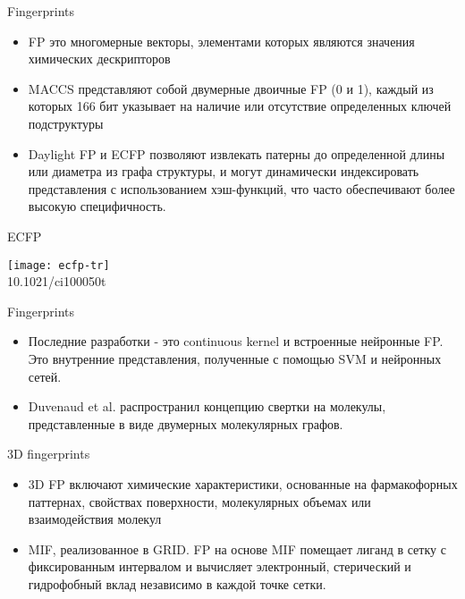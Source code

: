 \begin{frame}{Fingerprints}
    \begin{itemize}
        \item FP это многомерные векторы, элементами которых являются значения химических дескрипторов 
        \item MACCS представляют собой двумерные двоичные FP (0 и 1), каждый из которых 166 бит указывает на наличие или отсутствие определенных ключей подструктуры
        \item Daylight FP и ECFP  позволяют извлекать патерны до определенной длины или диаметра из графа структуры, и  могут динамически
            индексировать представления с использованием хэш-функций, что  часто обеспечивают более высокую специфичность.
        \end{itemize}
\end{frame}


\begin{frame}{ECFP}
    \begin{center}
        \texttt{[image: ecfp-tr]}\\

        \footnotesize 10.1021/ci100050t
    \end{center}
\end{frame}

\begin{frame}{Fingerprints}
    \begin{itemize}
        \item  Последние разработки - это continuous kernel и встроенные нейронные FP. Это внутренние представления, полученные с помощью SVM и нейронных сетей.
        \item Duvenaud et al. распространил концепцию свертки на молекулы, представленные в виде двумерных молекулярных графов. 
        \end{itemize}
\end{frame}

\begin{frame}{3D fingerprints}
    \begin{itemize}
        \item 3D FP  включают химические характеристики, основанные на фармакофорных паттернах, свойствах поверхности, молекулярных объемах или взаимодействия молекул 
        \item MIF, реализованное в GRID. FP на основе MIF помещает лиганд в сетку с фиксированным интервалом и вычисляет электронный, стерический и гидрофобный вклад независимо в каждой точке сетки.
    \end{itemize}
\end{frame}


